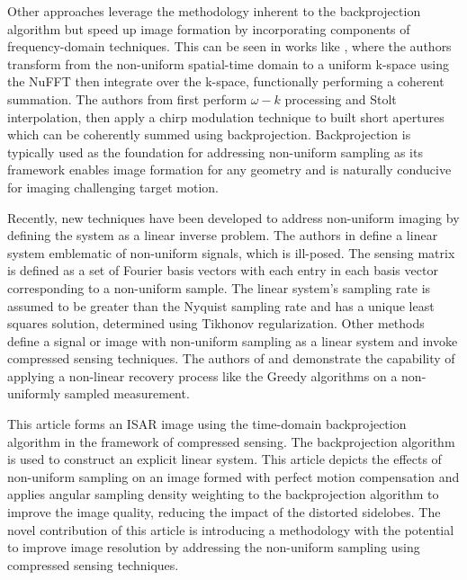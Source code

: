 \documentclass[conference]{IEEEtran}
\begin{document}
Other approaches leverage the methodology inherent to the backprojection algorithm but speed up image formation by incorporating components of frequency-domain techniques. This can be seen in works like \cite{Zhao_2018}, where the authors transform from the non-uniform spatial-time domain to a uniform k-space using the NuFFT then integrate over the k-space, functionally performing a coherent summation. The authors from \cite{Meng_2015} first perform $\omega-k$ processing and Stolt interpolation, then apply a chirp modulation technique to built short apertures which can be coherently summed using backprojection. Backprojection is typically used as the foundation for addressing non-uniform sampling as its framework enables image formation for any geometry and is naturally conducive for imaging challenging target motion.

Recently, new techniques have been developed to address non-uniform imaging by defining the system as a linear inverse problem. The authors in \cite{Zhang_2023} define a linear system emblematic of non-uniform signals, which is ill-posed. The sensing matrix is defined as a set of Fourier basis vectors with each entry in each basis vector corresponding to a non-uniform sample. The linear system's sampling rate is assumed to be greater than the Nyquist sampling rate and has a unique least squares solution, determined using Tikhonov regularization. Other methods define a signal or image with non-uniform sampling as a linear system and invoke compressed sensing techniques. The authors of \cite{Zobly_2011} and \cite{Bostock_2017} demonstrate the capability of applying a non-linear recovery process like the Greedy algorithms on a non-uniformly sampled measurement.

This article forms an ISAR image using the time-domain backprojection algorithm in the framework of compressed sensing. The backprojection algorithm is used to construct an explicit linear system. This article depicts the effects of non-uniform sampling on an image formed with perfect motion compensation and applies angular sampling density weighting to the backprojection algorithm to improve the image quality, reducing the impact of the distorted sidelobes. The novel contribution of this article is introducing a methodology with the potential to improve image resolution by addressing the non-uniform sampling using compressed sensing techniques.
\end{document}
